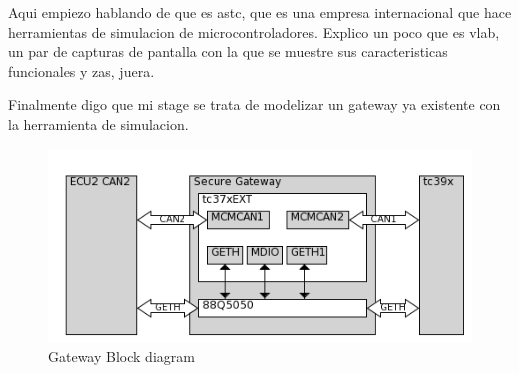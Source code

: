 Aqui empiezo hablando de que es astc, que es una empresa internacional que hace herramientas de simulacion de microcontroladores. Explico un poco que es vlab, un par de capturas de pantalla con la que se muestre sus caracteristicas funcionales y zas, juera. 

Finalmente digo que mi stage se trata de modelizar un gateway ya existente con la herramienta de simulacion.

\begin{figure}[!htb]
 \centering
 \includegraphics[width=\textwidth]{img/gateway_block_diagram.png}
 \caption{Gateway Block diagram}
 \label{fig:block diagram}
\end{figure}